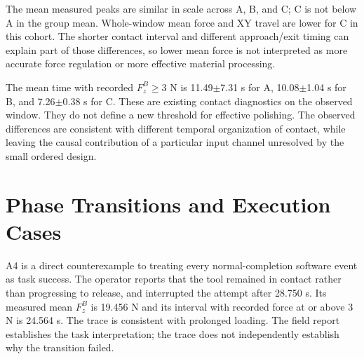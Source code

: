 \begin{table}[tbp]\centering\footnotesize
\caption[E2 all-attempt force and travel]{E2 all-attempt force and motion statistics, \(n=5\) per condition. ``Peak'' is the mean of per-run measured peaks. Whole-window mean force includes approach and exit and is not a contact-only force-quality measure.}
\label{tab:e2_force_travel}

\end{table}

The mean measured peaks are similar in scale across A, B, and C; C is not below A in the group mean. Whole-window mean force and XY travel are lower for C in this cohort. The shorter contact interval and different approach/exit timing can explain part of those differences, so lower mean force is not interpreted as more accurate force regulation or more effective material processing.

The mean time with recorded \(F_z^B\geq3\) N is 11.49\(\pm\)7.31 s for A, 10.08\(\pm\)1.04 s for B, and 7.26\(\pm\)0.38 s for C. These are existing contact diagnostics on the observed window. They do not define a new threshold for effective polishing. The observed differences are consistent with different temporal organization of contact, while leaving the causal contribution of a particular input channel unresolved by the small ordered design.


\section{Phase Transitions and Execution Cases}
A4 is a direct counterexample to treating every normal-completion software event as task success. The operator reports that the tool remained in contact rather than progressing to release, and interrupted the attempt after 28.750 s. Its measured mean \(F_z^B\) is 19.456 N and its interval with recorded force at or above 3 N is 24.564 s. The trace is consistent with prolonged loading. The field report establishes the task interpretation; the trace does not independently establish why the transition failed.


